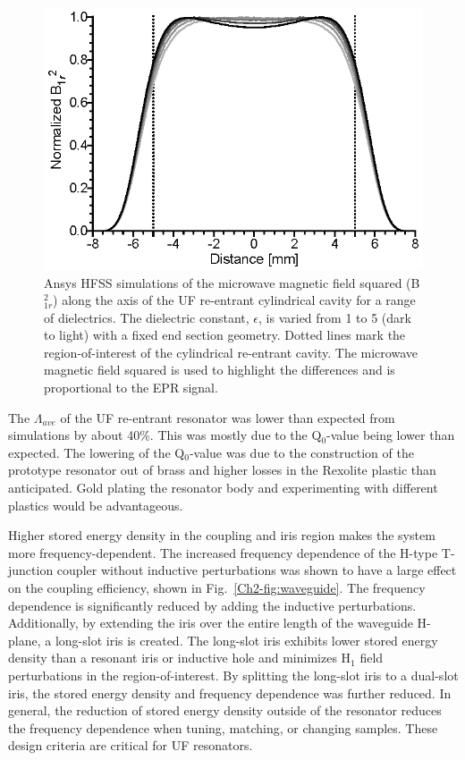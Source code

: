 \begin{figure}[htb]\centering
 \includegraphics{Kapitel/Ch2-Images/07-TE01UdielectircA.eps}
 \caption[Ansys HFSS simulations of with varying samples.]{Ansys HFSS simulations of the microwave magnetic field squared (B$^2_{1r}$) along the axis of the UF re-entrant cylindrical \cylTE{} cavity for a range of dielectrics. The dielectric constant, $\epsilon$, is varied from 1 to 5 (dark to light) with a fixed end section geometry. Dotted lines mark the region-of-interest of the cylindrical re-entrant \cylTE{} cavity.  The microwave magnetic field squared is used to highlight the differences and is proportional to the EPR signal. }
 \label{Ch2-fig:dielectric}
\end{figure}

The $\Lambda_{ave}$ of the UF re-entrant \cylTE{} resonator was lower than expected from simulations by about 40\%. This was mostly due to the Q$_0$-value being lower than expected. The lowering of the Q$_0$-value was due to the construction of the prototype resonator out of brass and higher losses in the Rexolite plastic than anticipated. Gold plating the resonator body and experimenting with different plastics would be advantageous. 

Higher stored energy density in the coupling and iris region makes the system more frequency-dependent. The increased frequency dependence of the H-type T-junction coupler without inductive perturbations was shown to have a large effect on the coupling efficiency, shown in Fig.~\ref{Ch2-fig:waveguide}. The frequency dependence is significantly reduced by adding the inductive perturbations. Additionally, by extending the iris over the entire length of the waveguide H-plane, a long-slot iris is created. \cite{Mett2009} The long-slot iris exhibits lower stored energy density than a resonant iris or inductive hole and minimizes H$_1$ field perturbations in the region-of-interest. By splitting the long-slot iris to a dual-slot iris, the stored energy density and frequency dependence was further reduced. In general, the reduction of stored energy density outside of the resonator reduces the frequency dependence when tuning, matching, or changing samples. These design criteria are critical for UF resonators. 

